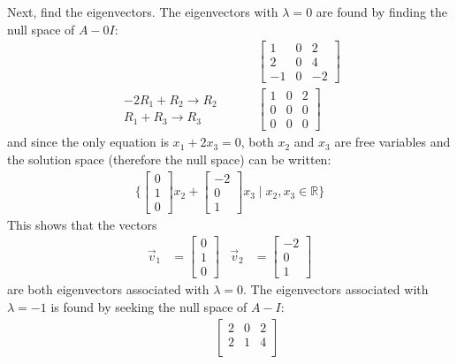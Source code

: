 \begin{example}
Next, find the eigenvectors. The eigenvectors with $\lambda=0$ are found by finding the null space of $A-0I$:
%
\begin{align*}
& \qquad \begin{bmatrix}
1 & 0 & 2 \\
2 & 0 & 4 \\
-1 & 0 & -2
\end{bmatrix} \\
\begin{array}{r}
-2R_1 + R_2 \rightarrow R_2 \\
R_1+R_3 \rightarrow R_3 
\end{array}
& \qquad 
\begin{bmatrix}
1 &0 & 2 \\
0 & 0 & 0 \\
0 & 0 & 0 
\end{bmatrix}
\end{align*}
and since the only equation is $x_1 +2x_3=0$, both $x_2$ and $x_3$ are free variables and the solution space (therefore the null space) can be written:
%
\begin{align*}
\{ \begin{bmatrix}
0 \\ 1 \\ 0
\end{bmatrix} x_2 + \begin{bmatrix}
-2 \\ 0 \\ 1
\end{bmatrix} x_3 \; | \; x_2, x_3 \in \mathbb{R} \} 
\end{align*}
This shows that the vectors 
%
\begin{align*}
\vec{v}_1 & = \begin{bmatrix}
0 \\ 1\\ 0
\end{bmatrix}&  \vec{v}_2 & = \begin{bmatrix}
-2 \\ 0 \\ 1
\end{bmatrix} 
\end{align*}
are both eigenvectors associated with $\lambda=0$.  The eigenvectors associated with $\lambda = -1$ is found by seeking the null space of $A-I$:
%
\begin{align*}
& \qquad \begin{bmatrix}
2 & 0 & 2 \\
2 & 1 & 4 \\

\end{bmatrix}
\end{align*}
\end{example}
